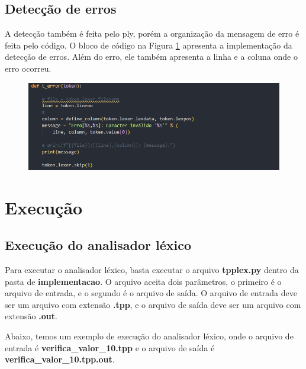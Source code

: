 \documentclass[12pt]{article}
\begin{document}
\subsection{Detecção de erros}
A detecção também é feita pelo ply, porém a organização da mensagem de erro é feita pelo código. O bloco de código na Figura \ref{fig:f4} apresenta a implementação da detecção de erros. Além do erro, ele também apresenta a linha e a coluna onde o erro ocorreu.

 
      \begin{figure}[h!]
        \centering
         \includegraphics[scale=0.8]{images/erros.png}
        \label{fig:f4}
        \end{figure}



\section{Execução}

\subsection{Execução do analisador léxico}
Para executar o analisador léxico, basta executar o arquivo \textbf{tpplex.py} dentro da pasta de \textbf{implementacao}. O arquivo aceita dois parâmetros, o primeiro é o arquivo de entrada, e o segundo é o arquivo de saída. O arquivo de entrada deve ser um arquivo com extensão \textbf{.tpp}, e o arquivo de saída deve ser um arquivo com extensão \textbf{.out}.

Abaixo, temos um exemplo de execução do analisador léxico, onde o arquivo de entrada é \textbf{verifica_valor_10.tpp} e o arquivo de saída é \textbf{verifica_valor_10.tpp.out}.
\end{document}
